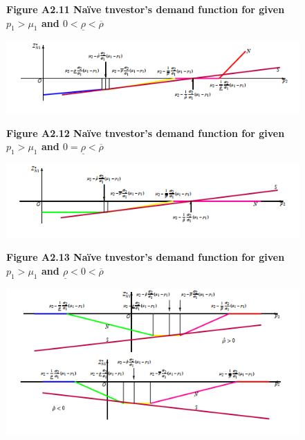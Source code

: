 \documentclass[10.0pt]{article}
\begin{document}
\newpage


\begin{figure}
\centerline{\bf Figure A2.11 \quad Na\"ive tnvestor's demand function for given $ p_1 > \mu_1 $ and $ 0 < \underline{\rho} < \overline{\rho} $}
	\centering
	\includegraphics[width=1.0 \textwidth]{FigureA2.11.png}
\end{figure}




\begin{figure}
\centerline{\bf Figure A2.12 \quad Na\"ive tnvestor's demand function for given $ p_1 > \mu_1 $ and $ 0 = \underline{\rho} < \overline{\rho} $}
	\centering
	\includegraphics[width=1.0 \textwidth]{FigureA2.12.png}
\end{figure}



\begin{figure}
\centerline{\bf Figure A2.13 \quad Na\"ive tnvestor's demand function for given $ p_1 > \mu_1 $ and $ \underline{\rho} < 0 < \overline{\rho} $}
	\centering
	\includegraphics[width=1.0 \textwidth]{FigureA2.13.png}
\end{figure}
\end{document}
